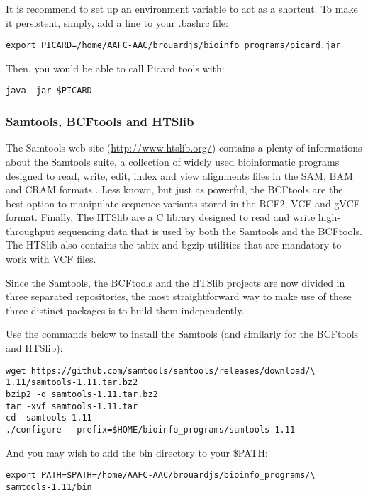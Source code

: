 It is recommend to set up an environment variable to act as a shortcut. To make it persistent, simply, add a line to your .bashrc file:

\begin{verbatim}
export PICARD=/home/AAFC-AAC/brouardjs/bioinfo_programs/picard.jar
\end{verbatim}

Then, you would be able to call Picard tools with:

\begin{verbatim}
java -jar $PICARD
\end{verbatim}


\subsubsection{Samtools, BCFtools and HTSlib}


The Samtools web site (\href{http://www.htslib.org/}{http://www.htslib.org/}) contains a plenty of informations about the Samtools suite, a collection of widely used bioinformatic programs designed to read, write, edit, index and view alignments files in the SAM, BAM and CRAM formats \cite{Danecek2021}. Less known, but just as powerful, the BCFtools are the best option to manipulate sequence variants stored in the BCF2, VCF and gVCF format. Finally, The HTSlib are a C library designed to read and write high-throughput sequencing data that is used by both the Samtools and the BCFtools. The HTSlib also contains the tabix and bgzip utilities that are mandatory to work with VCF files.

Since the Samtools, the BCFtools and the HTSlib projects are now divided in three separated repositories, the most straightforward way to make use of these three distinct packages is to build them independently. 

Use the commands below to install the Samtools (and similarly for the BCFtools and HTSlib):

\begin{verbatim}
wget https://github.com/samtools/samtools/releases/download/\
1.11/samtools-1.11.tar.bz2
bzip2 -d samtools-1.11.tar.bz2	
tar -xvf samtools-1.11.tar
cd  samtools-1.11
./configure --prefix=$HOME/bioinfo_programs/samtools-1.11
\end{verbatim}

And you may wish to add the bin directory to your \$PATH:

\begin{verbatim}
export PATH=$PATH=/home/AAFC-AAC/brouardjs/bioinfo_programs/\
samtools-1.11/bin
\end{verbatim}









